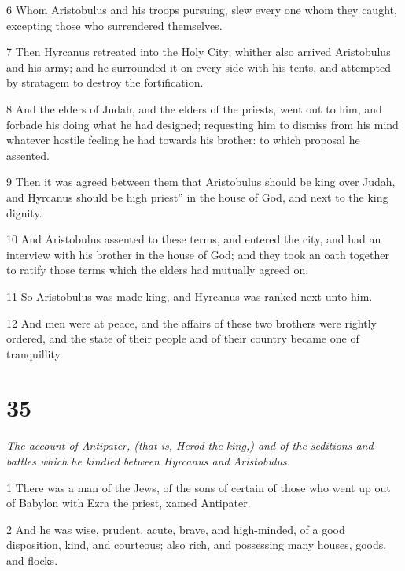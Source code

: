 \par 6 Whom Aristobulus and his troops pursuing, slew every one whom they caught, excepting those who surrendered themselves. 

\par 7 Then Hyrcanus retreated into the Holy City; whither also arrived Aristobulus and his army; and he surrounded it on every side with his tents, and attempted by stratagem to destroy the fortification. 

\par 8 And the elders of Judah, and the elders of the priests, went out to him, and forbade his doing what he had designed; requesting him to dismiss from his mind whatever hostile feeling he had towards his brother: to which proposal he assented. 

\par 9 Then it was agreed between them that Aristobulus should be king over Judah, and Hyrcanus should be high priest” in the house of God, and next to the king dignity. 

\par 10 And Aristobulus assented to these terms, and entered the city, and had an interview with his brother in the house of God; and they took an oath together to ratify those terms which the elders had mutually agreed on. 

\par 11 So Aristobulus was made king, and Hyrcanus was ranked next unto him. 

\par 12 And men were at peace, and the affairs of these two brothers were rightly ordered, and the state of their people and of their country became one of tranquillity. 

\chapter{35}

\par \textit{The account of Antipater, (that is, Herod the king,) and of the seditions and battles which he kindled between Hyrcanus and Aristobulus.}

\par 1 There was a man of the Jews, of the sons of certain of those who went up out of Babylon with Ezra the priest, xamed Antipater. 

\par 2 And he was wise, prudent, acute, brave, and high-minded, of a good disposition, kind, and courteous; also rich, and possessing many houses, goods, and flocks. 

